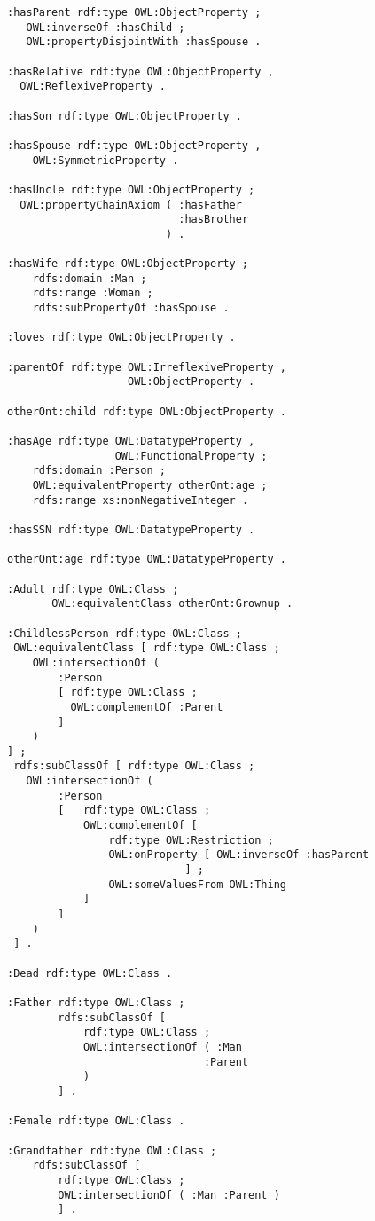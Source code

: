 \documentclass[11pt,a4paper,final,oneside,onecolumn]{article}
\begin{document}
\begin{lstlisting}[language=Turtle]
:hasParent rdf:type OWL:ObjectProperty ;
   OWL:inverseOf :hasChild ;
   OWL:propertyDisjointWith :hasSpouse .

:hasRelative rdf:type OWL:ObjectProperty ,
  OWL:ReflexiveProperty .

:hasSon rdf:type OWL:ObjectProperty .

:hasSpouse rdf:type OWL:ObjectProperty ,
    OWL:SymmetricProperty .

:hasUncle rdf:type OWL:ObjectProperty ;
  OWL:propertyChainAxiom ( :hasFather
                           :hasBrother
                         ) .

:hasWife rdf:type OWL:ObjectProperty ;
    rdfs:domain :Man ;
    rdfs:range :Woman ;
    rdfs:subPropertyOf :hasSpouse .

:loves rdf:type OWL:ObjectProperty .

:parentOf rdf:type OWL:IrreflexiveProperty ,
                   OWL:ObjectProperty .

otherOnt:child rdf:type OWL:ObjectProperty .

:hasAge rdf:type OWL:DatatypeProperty ,
                 OWL:FunctionalProperty ;
    rdfs:domain :Person ;
    OWL:equivalentProperty otherOnt:age ;
    rdfs:range xs:nonNegativeInteger .

:hasSSN rdf:type OWL:DatatypeProperty .

otherOnt:age rdf:type OWL:DatatypeProperty .

:Adult rdf:type OWL:Class ;
       OWL:equivalentClass otherOnt:Grownup .

:ChildlessPerson rdf:type OWL:Class ;
 OWL:equivalentClass [ rdf:type OWL:Class ;
    OWL:intersectionOf ( 
        :Person
        [ rdf:type OWL:Class ;
          OWL:complementOf :Parent
        ]
    )
] ;
 rdfs:subClassOf [ rdf:type OWL:Class ;
   OWL:intersectionOf ( 
        :Person
        [   rdf:type OWL:Class ;
            OWL:complementOf [ 
                rdf:type OWL:Restriction ;
                OWL:onProperty [ OWL:inverseOf :hasParent
                            ] ;
                OWL:someValuesFrom OWL:Thing
            ]   
        ]
    )
 ] .

:Dead rdf:type OWL:Class .

:Father rdf:type OWL:Class ;
        rdfs:subClassOf [ 
            rdf:type OWL:Class ;
            OWL:intersectionOf ( :Man
                               :Parent
            )
        ] .

:Female rdf:type OWL:Class .

:Grandfather rdf:type OWL:Class ;
    rdfs:subClassOf [ 
        rdf:type OWL:Class ;
        OWL:intersectionOf ( :Man :Parent )
        ] .


\end{lstlisting}
\end{document}

